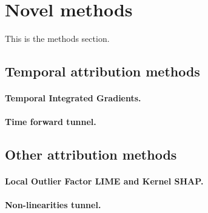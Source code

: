\section{Novel methods}
\label{sec:methods}

This is the methods section.


\subsection{Temporal attribution methods}
\label{subsec:temporal-attribution-methods}

\paragraph{Temporal Integrated Gradients.}

\paragraph{Time forward tunnel.}


\subsection{Other attribution methods}
\label{subsec:other-attribution-methods}

\paragraph{Local Outlier Factor LIME and Kernel SHAP\@.}

\paragraph{Non-linearities tunnel.}
